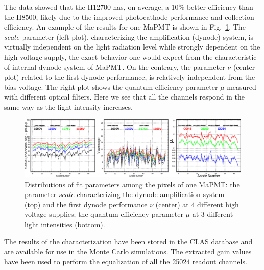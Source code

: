 \documentclass[5p,times,twocolumn]{elsarticle}
\begin{document}
The data showed that the H12700 has, on average, a 10\% better efficiency than the H8500, likely due to the improved photocathode performance and collection efficiency. An example of the results for one MaPMT is shown in Fig.~\ref{fig:PavelPassport}. The $scale$ parameter (left plot), characterizing the amplification (dynode) system, is virtually independent on the light radiation level while strongly dependent on the high voltage supply, the exact behavior one would expect from the characteristic of internal dynode system of MaPMT. On the contrary, the parameter $\nu$ (center plot) related to the first dynode performance, is relatively independent from the bias voltage. The right plot shows the quantum efficiency parameter $\mu$ measured with different optical filters. Here we see that all the channels respond in the same way as the light intensity increases.

\begin{figure}[h]
	\centering
	\includegraphics[width=\linewidth]{PavelPassport.pdf}
	\caption{Distributions of fit parameters among the pixels of one MaPMT: the parameter $scale$ characterizing the dynode amplification system (top) and the first dynode performance $\nu$ (center) at 4 different high voltage supplies; the quantum efficiency parameter $\mu$ at 3 different light intensities (bottom).}
	\label{fig:PavelPassport}
\end{figure}

The results of the characterization have been stored in the CLAS database and are available for use in the Monte Carlo simulations. The extracted gain values have been used to perform the equalization of all the 25024 readout channels.

\end{document}
